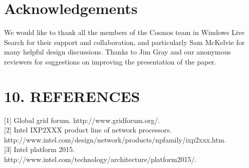 \documentclass[
]{article}
\begin{document}
\section{Acknowledgements}\label{acknowledgements}

We would like to thank all the members of the Cosmos team in Windows
Live Search for their support and collaboration, and particularly Sam
McKelvie for many helpful design discussions. Thanks to Jim Gray and our
anonymous reviewers for suggestions on improving the presentation of the
paper.

\section{10. REFERENCES}\label{references}

{[}1{]} Global grid forum. http://www.gridforum.org/.\\
{[}2{]} Intel IXP2XXX product line of network processors.
http://www.intel.com/design/network/products/npfamily/ixp2xxx.htm.\\
{[}3{]} Intel platform 2015.
http://www.intel.com/technology/architecture/platform2015/.
\end{document}
